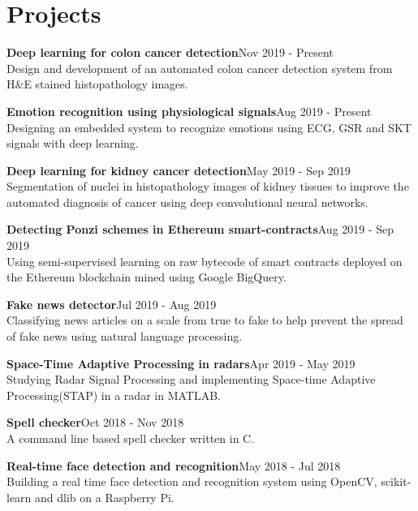 \documentclass[letterpaper]{article}
\renewenvironment{itemize}{
  \begin{list}{}{
    \setlength{\leftmargin}{1.5em}
  }
}{
  \end{list}
}
\begin{document}
\section*{Projects}
  \begin{itemize}
    \item
    \textbf{Deep learning for colon cancer detection}\hfill{Nov 2019 - Present}\\
    Design and development of an automated colon cancer detection system from H\&E stained histopathology images.

    \item
    \textbf{Emotion recognition using physiological signals}\hfill{Aug 2019 - Present}\\
    Designing an embedded system to recognize emotions using ECG, GSR and SKT signals with deep learning.

    \item
    \textbf{Deep learning for kidney cancer detection}\hfill{May 2019 - Sep 2019}\\
    Segmentation of nuclei in histopathology images of kidney tissues to improve the automated diagnosis of cancer using deep convolutional neural networks.

    \item
    \textbf{Detecting Ponzi schemes in Ethereum smart-contracts}\hfill{Aug 2019 - Sep 2019}\\
    Using semi-supervised learning on raw bytecode of smart contracts deployed on the Ethereum blockchain mined using Google BigQuery.

    \item
    \textbf{Fake news detector}\hfill{Jul 2019 - Aug 2019}\\
    Classifying news articles on a scale from true to fake to help prevent the spread of fake news using natural language processing.

    \item
    \textbf{Space-Time Adaptive Processing in radars}\hfill{Apr 2019 - May 2019}\\
    Studying Radar Signal Processing and implementing Space-time Adaptive Processing(STAP) in a radar in MATLAB.

    \item
    \textbf{Spell checker}\hfill{Oct 2018 - Nov 2018}\\
    A command line based spell checker written in C.

    \item
    \textbf{Real-time face detection and recognition}\hfill{May 2018 - Jul 2018}\\
    Building a real time face detection and recognition system using OpenCV, scikit-learn and dlib on a Raspberry Pi.

  \end{itemize}
\end{document}
